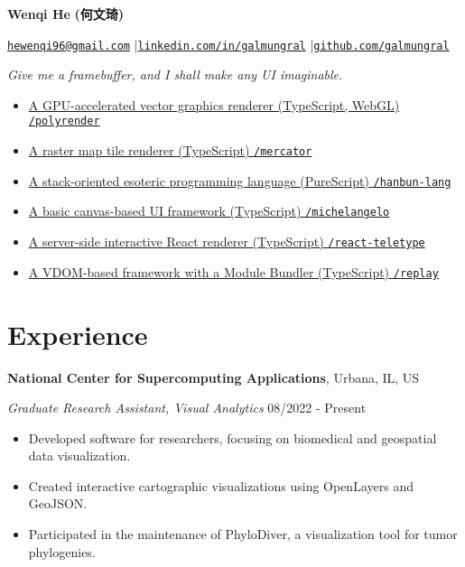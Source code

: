 \documentclass[12pt]{article}
\begin{document}
{\Huge\bf Wenqi He} {\Large\bf\cjkfont (何文琦)}

\vspace{1em}
\href{mailto:hewenqi96@gmail.com}{\texttt{hewenqi96@gmail.com}} \quad|\quad \href{https://linkedin.com/in/galmungral}{\texttt{linkedin.com/in/galmungral}} \quad|\quad \href{https://github.com/galmungral}{\texttt{github.com/galmungral}}

\vspace{1em}
\textit{Give me a framebuffer, and I shall make any UI imaginable.}

\begin{itemize}
\item \href{https://galmungral.github.io/polyrender}{A GPU-accelerated vector graphics renderer (TypeScript, WebGL) \hfill \texttt{/polyrender}}
\item \href{https://galmungral.github.io/mercator?lon=-73.9855&lat=40.7580}{A raster map tile renderer (TypeScript) \hfill \texttt{/mercator}}
\item \href{https://galmungral.github.io/hanbun-lang}{A stack-oriented esoteric programming language (PureScript) \hfill \texttt{/hanbun-lang}}
\item \href{https://galmungral.github.io/michelangelo}{A basic canvas-based UI framework (TypeScript) \hfill \texttt{/michelangelo}}
\item\href{https://github.com/galmungral/react-teletype}{A server-side interactive React renderer (TypeScript) \hfill \texttt{/react-teletype}}
\item \href{https://github.com/galmungral/replay}{A VDOM-based framework with a Module Bundler (TypeScript) \hfill \texttt{/replay}}
\end{itemize}

\section*{Experience}

\textbf{National Center for Supercomputing Applications}, Urbana, IL, US

\textit{Graduate Research Assistant, Visual Analytics} \hfill 08/2022 - Present

\begin{itemize}
\item Developed software for researchers, focusing on biomedical and geospatial data visualization.
\item Created interactive cartographic visualizations using OpenLayers and GeoJSON.
\item Participated in the maintenance of PhyloDiver, a visualization tool for tumor phylogenies.
\end{itemize}
\end{document}
